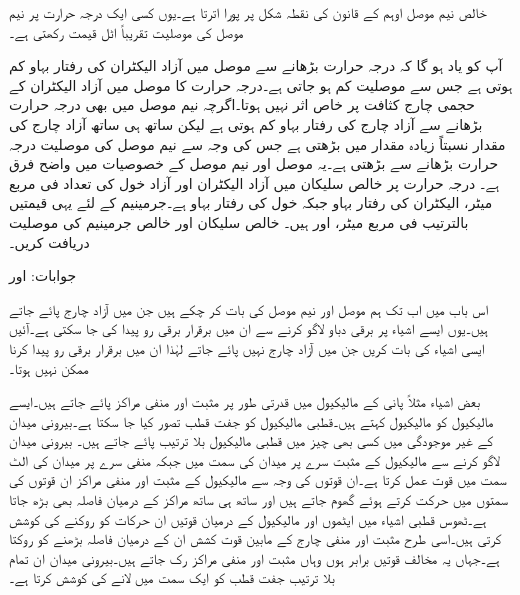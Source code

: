 خالص نیم موصل اوہم کے قانون کی نقطہ شکل پر پورا اترتا ہے۔یوں کسی ایک درجہ حرارت پر نیم موصل کی موصلیت تقریباً اٹل قیمت رکھتی ہے۔  

آپ کو یاد ہو گا کہ درجہ حرارت بڑھانے سے موصل میں آزاد الیکٹران کی رفتار بہاو کم ہوتی ہے جس سے موصلیت کم  ہو جاتی ہے۔درجہ حرارت کا موصل میں آزاد الیکٹران کے حجمی چارج کثافت پر خاص اثر نہیں ہوتا۔اگرچہ نیم موصل میں بھی درجہ حرارت بڑھانے سے آزاد چارج کی رفتار بہاو کم ہوتی ہے لیکن ساتھ ہی ساتھ آزاد چارج کی مقدار نسبتاً زیادہ مقدار میں بڑھتی ہے جس  کی وجہ سے نیم موصل کی  موصلیت درجہ حرارت بڑھانے سے بڑھتی ہے۔یہ موصل اور نیم موصل کے خصوصیات میں واضح فرق ہے۔
 درجہ حرارت پر خالص سلیکان میں آزاد الیکٹران اور آزاد خول کی تعداد  فی مربع میٹر، الیکٹران کی رفتار بہاو  جبکہ خول کی رفتار بہاو  ہے۔جرمینیم کے لئے یہی قیمتیں بالترتیب  فی مربع میٹر،  اور  ہیں۔ خالص سلیکان اور خالص جرمینیم کی موصلیت دریافت کریں۔

جوابات: اور 


اس باب میں اب تک ہم موصل اور نیم موصل کی بات کر چکے ہیں جن میں آزاد چارج پائے جاتے ہیں۔یوں ایسے اشیاء پر برقی دباو لاگو کرنے سے ان میں برقرار برقی رو پیدا کی جا سکتی ہے۔آئیں ایسی اشیاء کی بات کریں جن میں آزاد چارج نہیں پائے جاتے لہٰذا ان میں برقرار برقی رو پیدا کرنا ممکن نہیں ہوتا۔

بعض اشیاء مثلاً پانی  کے مالیکیول میں قدرتی طور پر مثبت اور منفی مراکز پائے جاتے  ہیں۔ایسے مالیکیول کو  مالیکیول کہتے ہیں۔قطبی مالیکیول کو جفت قطب تصور کیا جا سکتا ہے۔بیرونی میدان کے غیر موجودگی میں کسی بھی چیز میں قطبی مالیکیول بلا ترتیب پائے جاتے ہیں۔ بیرونی میدان  لاگو کرنے سے مالیکیول کے مثبت سرے پر میدان کی سمت میں جبکہ منفی سرے پر میدان کی الٹ سمت میں  قوت عمل کرتا ہے۔ان قوتوں کی وجہ سے مالیکیول کے مثبت اور منفی مراکز ان قوتوں کی سمتوں میں حرکت کرتے ہوئے گھوم جاتے ہیں اور ساتھ ہی ساتھ مراکز کے درمیان فاصلہ بھی بڑھ جاتا ہے۔ٹھوس قطبی اشیاء میں ایٹموں اور مالیکیول کے درمیان قوتیں ان حرکات کو روکنے کی کوشش کرتی ہیں۔اسی طرح مثبت اور منفی چارج کے مابین قوت کشش ان کے درمیان فاصلہ بڑھنے کو روکتا ہے۔جہاں یہ مخالف قوتیں برابر ہوں وہاں مثبت اور منفی مراکز رک جاتے ہیں۔بیرونی میدان ان تمام بلا ترتیب جفت قطب کو ایک سمت میں لانے کی کوشش کرتا ہے۔


